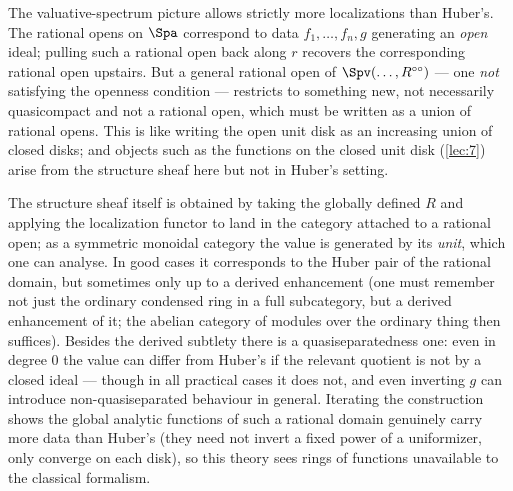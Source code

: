 \begin{remark}
\label{rmk:9:more-than-huber}
The valuative-spectrum picture allows strictly more localizations than Huber's.
The rational opens on $\Spa$ correspond to data $f_{1},\dots,f_{n},g$ generating
an \emph{open} ideal; pulling such a rational open back along $r$ recovers the
corresponding rational open upstairs. But a general rational open of
$\Spv(\dots,R^{\circ\circ})$ --- one \emph{not} satisfying the openness
condition --- restricts to something new, not necessarily quasicompact and not a
rational open, which must be written as a union of rational opens. This is like
writing the open unit disk as an increasing union of closed disks; and objects
such as the functions on the closed unit disk (\cref{lec:7}) arise from the
structure sheaf here but not in Huber's setting.

The structure sheaf itself is obtained by taking the globally defined $R$ and
applying the localization functor to land in the category attached to a rational
open; as a symmetric monoidal category the value is generated by its \emph{unit},
which one can analyse. In good cases it corresponds to the Huber pair of the
rational domain, but sometimes only up to a derived enhancement (one must
remember not just the ordinary condensed ring in a full subcategory, but a
derived enhancement of it; the abelian category of modules over the ordinary
thing then suffices). Besides the derived subtlety there is a
quasiseparatedness one: even in degree $0$ the value can differ from Huber's if
the relevant quotient is not by a closed ideal --- though in all practical cases
it does not, and even inverting $g$ can introduce non-quasiseparated behaviour in
general. Iterating the construction shows the global analytic functions of such a
rational domain genuinely carry more data than Huber's (they need not invert a
fixed power of a uniformizer, only converge on each disk), so this theory sees
rings of functions unavailable to the classical formalism.
\end{remark}
